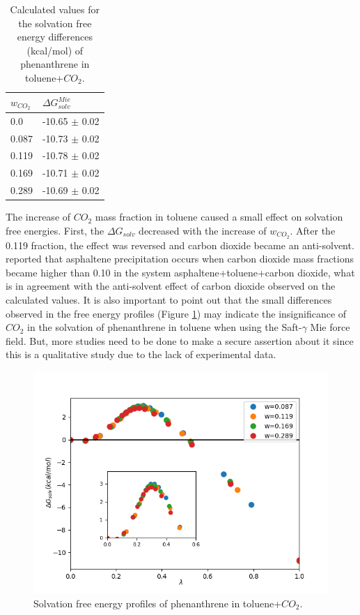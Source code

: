 \FloatBarrier
\begin{table}[H]
\centering
  \caption{Calculated values for the solvation free energy differences (kcal/mol) of phenanthrene in toluene+$CO_{2}$.}
  \label{tbl:solv3}
  \begin{tabular}{ll}
    \hline
    \hline
      $w_{CO_{2}}$ & $\Delta G_{solv}^{Mie}$ \\
    \hline
    0.0    & -10.65 $\pm$ 0.02   \\
    0.087  & -10.73 $\pm$ 0.02   \\
    0.119  & -10.78 $\pm$ 0.02   \\
    0.169  & -10.71 $\pm$ 0.02   \\
    0.289  & -10.69 $\pm$ 0.02   \\
    \hline
    \hline
  \end{tabular}
\end{table}
\FloatBarrier

The increase of $CO_{2}$ mass fraction in toluene caused a small effect on solvation free energies. First, the $\Delta G_{solv}$ decreased with the increase of $w_{CO_{2}}$. After the 0.119 fraction, the effect was reversed and carbon dioxide became an anti-solvent.  reported that asphaltene precipitation occurs when carbon dioxide mass fractions became higher than 0.10 in the system asphaltene+toluene+carbon dioxide, what is in agreement with the anti-solvent effect of carbon dioxide observed on the calculated values. It is also important to point out that the small differences observed in the free energy profiles (Figure \ref{fig:Figure_1}) may indicate the insignificance of $CO_{2}$ in the solvation of phenanthrene in toluene when using the Saft-$\gamma$ Mie force field. But, more studies need to be done to make a secure assertion about it since this is a qualitative study due to the lack of experimental data.   

\begin{figure}[H]
\centering
\includegraphics[width=0.9\linewidth]{Figures/Figure_1}
\caption{Solvation free energy profiles of phenanthrene in toluene+$CO_{2}$.}
\label{fig:Figure_1}
\end{figure}


